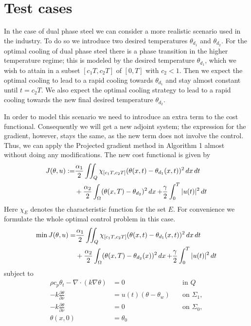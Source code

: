 \section{Test cases}

In the case of dual phase steel we can consider a more realistic scenario used in the industry. To do so we introduce two desired temperatures $\theta_{d_1}$ and $\theta_{d_2}$. For the optimal cooling of dual phase steel there is a phase transition in the higher temperature regime; this is modeled by the desired temperature $\theta_{d_1}$, which we wish to attain in a subset $[c_1T, c_2T]$ of $[0,T]$ with $c_2 < 1$. Then we expect the optimal cooling to lead to a rapid cooling towards $\theta_{d_1}$ and stay almost constant until $t=c_2T$. We also expect the optimal cooling strategy to lead to a rapid cooling towards the new final desired temperature $\theta_{d_2}$.

In order to model this scenario we need to introduce an extra term to the cost functional. Consequently we will get a new adjoint system; the expression for the gradient, however, stays the same, as the new term does not involve the control. Thus, we can apply the Projected gradient method in Algorithm 1 almost without doing any modifications. The new cost functional is given by 
\begin{equation}
\begin{aligned}
    \label{eq:new_cost}
    J(\theta,u) : =& \frac{\alpha_1}{2}\iint_{Q}\chi_{[c_1T,c_2T]}(\theta(x,t) - \theta_{d_1}(x,t))^2 \mathop{dx}\mathop{dt} \\
    &+ \frac{\alpha_2}{2}\int_{\Omega} (\theta(x,T) - \theta_{d_2})^2 \mathop{dx} + \frac{\gamma}{2}\int_0^T|u(t)|^2\mathop{dt}
\end{aligned}
\end{equation}
Here $\chi_E$ denotes the characteristic function for the set $E$. For convenience we formulate the whole optimal control problem in this case. 
\begin{equation*}
\begin{aligned}
   \min J(\theta, u) =& \frac{\alpha_1}{2}\iint_{Q}\chi_{[c_1T,c_2T]}(\theta(x,t) - \theta_{d_1}(x,t))^2 \mathop{dx}\mathop{dt} \\
   &+ \frac{\alpha_2}{2} \int_\Omega (\theta(x, T) - \theta_{d_2}(x))^2 \mathop{dx} + \frac{\gamma}{2} \int_0^{T} |u(t)|^2 \mathop{dt} 
\end{aligned}
\end{equation*}
subject to
\begin{align*}
       \rho c_p \theta_t - \nabla \cdot (k \nabla \theta) &= 0 \quad &\text{in } Q  \\
      -k \frac{\partial \theta}{\partial \nu} &= u(t) (\theta - \theta_w) \quad &\text{on } \Sigma_1, \\
      -k \frac{\partial \theta}{\partial \nu} &= 0 \quad &\text{on } \Sigma_0, \\
      \theta(x, 0) &= \theta_0 &
\end{align*}

